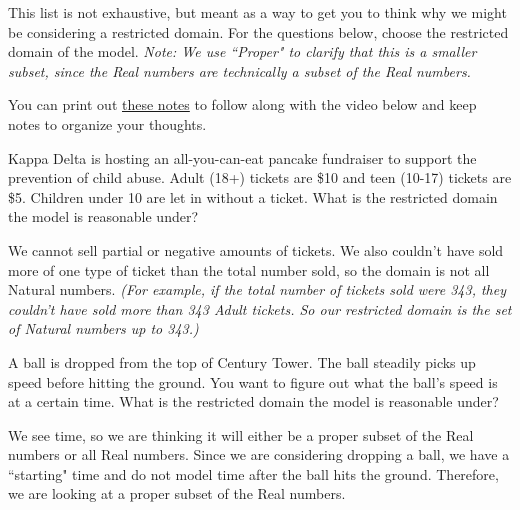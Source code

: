 \documentclass{ximera}
\begin{document}
This list is not exhaustive, but meant as a way to get you to think why we might be considering a restricted domain. For the questions below, choose the restricted domain of the model. \textit{Note: We use ``Proper" to clarify that this is a smaller subset, since the Real numbers are technically a subset of the Real numbers.} 

You can print out \href{http://people.clas.ufl.edu/dchamberlain31/files/M9M-Objective-1-Identify-Linear.pdf}{these notes} to follow along with the video below and keep notes to organize your thoughts.


\begin{question}
Kappa Delta is hosting an all-you-can-eat pancake fundraiser to support the prevention of child abuse. Adult (18+) tickets are \$10 and teen (10-17) tickets are \$5. Children under 10 are let in without a ticket. What is the restricted domain the model is reasonable under?

\begin{multipleChoice}
\end{multipleChoice}

\begin{feedback}[correct]
We cannot sell partial or negative amounts of tickets. We also couldn't have sold more of one type of ticket than the total number sold, so the domain is not all Natural numbers. \textit{(For example, if the total number of tickets sold were 343, they couldn't have sold more than 343 Adult tickets. So our restricted domain is the set of Natural numbers up to 343.)}
\end{feedback}
\end{question}

\begin{question}
A ball is dropped from the top of Century Tower. The ball steadily picks up speed before hitting the ground. You want to figure out what the ball's speed is at a certain time. What is the restricted domain the model is reasonable under?

\begin{multipleChoice}
\end{multipleChoice}

\begin{feedback}[correct]
We see time, so we are thinking it will either be a proper subset of the Real numbers or all Real numbers. Since we are considering dropping a ball, we have a ``starting" time and do not model time after the ball hits the ground. Therefore, we are looking at a proper subset of the Real numbers. 
\end{feedback}

\end{question}
\end{document}
